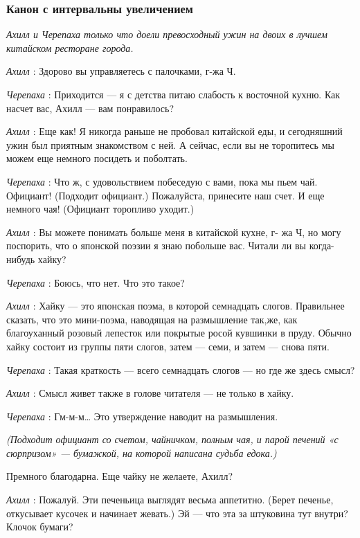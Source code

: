 \subsubsection{Канон с интервальны увеличением}

\emph{Ахилл и Черепаха только что доели превосходный ужин на двоих в лучшем китайском ресторане города.}

\emph{Ахилл} : Здорово вы управляетесь с палочками, г-жа Ч.

\emph{Черепаха} : Приходится --- я с детства питаю слабость к восточной кухню. Как насчет вас, Ахилл --- вам понравилось?

\emph{Ахилл} : Еще как! Я никогда раньше не пробовал китайской еды, и сегодняшний ужин был приятным знакомством с ней. А сейчас, если вы не торопитесь мы можем еще немного посидеть и поболтать.

\emph{Черепаха} : Что ж, с удовольствием побеседую с вами, пока мы пьем чай. Официант! (Подходит официант.) Пожалуйста, принесите наш счет. И еще немного чая! (Официант торопливо уходит.)

\emph{Ахилл} : Вы можете понимать больше меня в китайской кухне, г- жа Ч, но могу поспорить, что о японской поэзии я знаю побольше вас. Читали ли вы когда-нибудь хайку?

\emph{Черепаха} : Боюсь, что нет. Что это такое?

\emph{Ахилл} : Хайку --- это японская поэма, в которой семнадцать слогов. Правильнее сказать, что это мини-поэма, наводящая на размышление так,же, как благоуханный розовый лепесток или покрытые росой кувшинки в пруду. Обычно хайку состоит из группы пяти слогов, затем --- семи, и затем --- снова пяти.

\emph{Черепаха} : Такая краткость --- всего семнадцать слогов --- но где же здесь смысл?

\emph{Ахилл} : Смысл живет также в голове читателя --- не только в хайку.

\emph{Черепаха} : Гм-м-м\ldots{} Это утверждение наводит на размышления.

\emph{(Подходит официант со счетом, чайничком, полным чая, и парой печений «с сюрпризом» --- бумажкой, на которой написана судьба едока.)}

Премного благодарна. Еще чайку не желаете, Ахилл?

\emph{Ахилл} : Пожалуй. Эти печеньица выглядят весьма аппетитно. (Берет печенье, откусывает кусочек и начинает жевать.) Эй --- что эта за штуковина тут внутри? Клочок бумаги?

